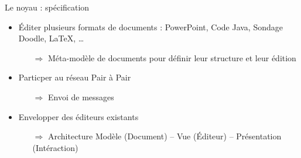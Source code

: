 \begin{frame}{Le noyau : spécification}
\begin{itemize}
  \item Éditer plusieurs formats de documents : PowerPoint, Code Java, Sondage
  Doodle, \LaTeX, \ldots 
    \begin{itemize}
    \item[$\Rightarrow$] Méta-modèle de documents pour définir leur structure
    et leur édition
    \end{itemize}
  \item Particper au réseau Pair à Pair
    \begin{itemize}
    \item[$\Rightarrow$] Envoi de messages
    \end{itemize}
  \item Envelopper des éditeurs existants
    \begin{itemize}
    \item[$\Rightarrow$] Architecture Modèle (Document) -- Vue (Éditeur) --
    Présentation (Intéraction)
    \end{itemize}
\end{itemize}
\end{frame}

